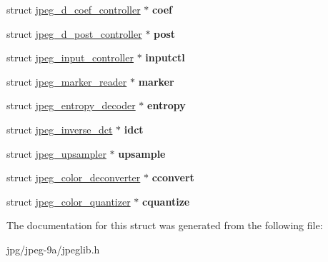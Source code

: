 \begin{DoxyCompactItemize}
\item 
\hypertarget{structjpeg__decompress__struct_a25ff493a838c250917bf874a70bdb6f2}{struct \hyperlink{structjpeg__d__coef__controller}{jpeg\+\_\+d\+\_\+coef\+\_\+controller} $\ast$ {\bfseries coef}}\label{structjpeg__decompress__struct_a25ff493a838c250917bf874a70bdb6f2}

\item 
\hypertarget{structjpeg__decompress__struct_aa23ccd90094cf7cf11f8f688eb28988e}{struct \hyperlink{structjpeg__d__post__controller}{jpeg\+\_\+d\+\_\+post\+\_\+controller} $\ast$ {\bfseries post}}\label{structjpeg__decompress__struct_aa23ccd90094cf7cf11f8f688eb28988e}

\item 
\hypertarget{structjpeg__decompress__struct_aba60d9f35b5b2357fd7d9b28809cb087}{struct \hyperlink{structjpeg__input__controller}{jpeg\+\_\+input\+\_\+controller} $\ast$ {\bfseries inputctl}}\label{structjpeg__decompress__struct_aba60d9f35b5b2357fd7d9b28809cb087}

\item 
\hypertarget{structjpeg__decompress__struct_a59a6ada58d57b412fe89e1a531323b50}{struct \hyperlink{structjpeg__marker__reader}{jpeg\+\_\+marker\+\_\+reader} $\ast$ {\bfseries marker}}\label{structjpeg__decompress__struct_a59a6ada58d57b412fe89e1a531323b50}

\item 
\hypertarget{structjpeg__decompress__struct_ac53f055b3d8103caa6c7ba4b4975eb5b}{struct \hyperlink{structjpeg__entropy__decoder}{jpeg\+\_\+entropy\+\_\+decoder} $\ast$ {\bfseries entropy}}\label{structjpeg__decompress__struct_ac53f055b3d8103caa6c7ba4b4975eb5b}

\item 
\hypertarget{structjpeg__decompress__struct_a2ef67a2829f8ecebb1af0ed440bff8bf}{struct \hyperlink{structjpeg__inverse__dct}{jpeg\+\_\+inverse\+\_\+dct} $\ast$ {\bfseries idct}}\label{structjpeg__decompress__struct_a2ef67a2829f8ecebb1af0ed440bff8bf}

\item 
\hypertarget{structjpeg__decompress__struct_a80ad7e1c14488a065697b09679479c5d}{struct \hyperlink{structjpeg__upsampler}{jpeg\+\_\+upsampler} $\ast$ {\bfseries upsample}}\label{structjpeg__decompress__struct_a80ad7e1c14488a065697b09679479c5d}

\item 
\hypertarget{structjpeg__decompress__struct_a1f88347e58f8f9d93954aa885f3497fb}{struct \hyperlink{structjpeg__color__deconverter}{jpeg\+\_\+color\+\_\+deconverter} $\ast$ {\bfseries cconvert}}\label{structjpeg__decompress__struct_a1f88347e58f8f9d93954aa885f3497fb}

\item 
\hypertarget{structjpeg__decompress__struct_ace3f4f51b8cf7bd24428ae9d10f5ddf1}{struct \hyperlink{structjpeg__color__quantizer}{jpeg\+\_\+color\+\_\+quantizer} $\ast$ {\bfseries cquantize}}\label{structjpeg__decompress__struct_ace3f4f51b8cf7bd24428ae9d10f5ddf1}

\end{DoxyCompactItemize}


The documentation for this struct was generated from the following file\+:\begin{DoxyCompactItemize}
\item 
jpg/jpeg-\/9a/jpeglib.\+h\end{DoxyCompactItemize}
